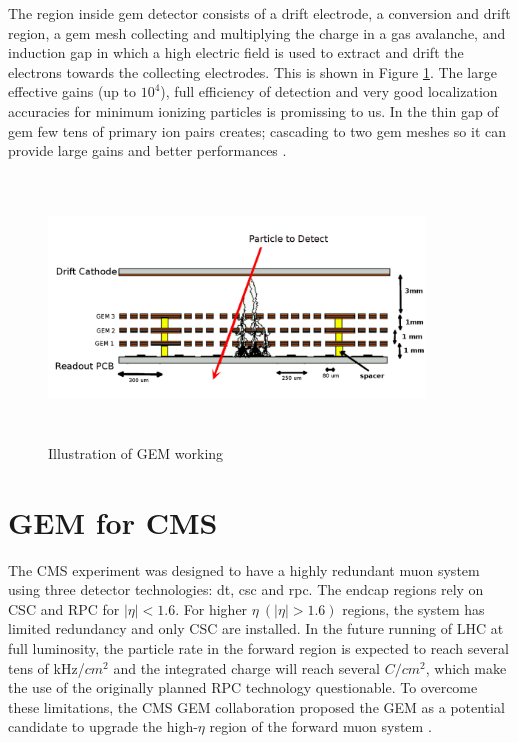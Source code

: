 The region inside {gem} detector consists of a drift electrode, a conversion and drift region, a {gem} mesh collecting and multiplying the charge in a gas avalanche, and induction gap in which a high electric field is used to extract and drift the electrons towards the collecting electrodes. This is shown in Figure \ref{gemgaps}. The large effective gains (up to $10^4$), full efficiency of detection and very good localization accuracies for minimum ionizing particles is promissing to us. In the thin gap of {gem} few tens of primary ion pairs creates; cascading to two {gem} meshes so it can provide large gains and better performances \cite{paper:2dgem}.
\begin{figure}[htb]
	\begin{center}
		\includegraphics[width=10.0cm,height=7cm]{figures/GEM/triple_gem.png}
		\caption{Illustration of GEM working}
		\label{gemgaps}
	\end{center}
\end{figure} 

\section{GEM for CMS}
The CMS experiment was designed to have a highly redundant muon system using three detector technologies: {dt}, {csc} and {rpc}. The endcap regions rely on CSC and RPC for $|\eta|<1.6$. For higher $\eta~ (|\eta|>1.6)$ regions, the system has limited redundancy and only CSC are installed. In the future running of LHC at full luminosity, the particle rate in the forward region is expected to reach several tens of kHz/$cm^2$ and the integrated charge will reach several $C/cm^2$, which make the use of the originally planned RPC technology questionable. To overcome these limitations, the CMS GEM collaboration proposed the GEM as a potential candidate to upgrade the high-$\eta$ region of the forward muon system \cite{gemTDR}. 

